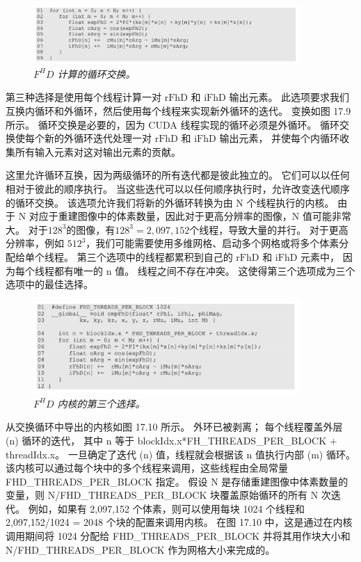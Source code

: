 \begin{figure}[H]
	\centering
	\includegraphics[width=0.9\textwidth]{figs/F17.9.png}
	\caption{\textit{$F^H D$ 计算的循环交换。}}
\end{figure}

第三种选择是使用每个线程计算一对 $\mathrm{rFhD}$ 和 $\mathrm{iFhD}$ 输出元素。 
此选项要求我们互换内循环和外循环，然后使用每个线程来实现新外循环的迭代。 
变换如图 17.9 所示。 循环交换是必要的，因为 CUDA 线程实现的循环必须是外循环。 
循环交换使每个新的外循环迭代处理一对 $\mathrm{rFhD}$ 和 $\mathrm{iFhD}$ 输出元素，
并使每个内循环收集所有输入元素对这对输出元素的贡献。

这里允许循环互换，因为两级循环的所有迭代都是彼此独立的。 它们可以以任何相对于彼此的顺序执行。 
当这些迭代可以以任何顺序执行时，允许改变迭代顺序的循环交换。 该选项允许我们将新的外循环转换为由 N 个线程执行的内核。 
由于 N 对应于重建图像中的体素数量，因此对于更高分辨率的图像，$\mathrm{N}$ 值可能非常大。 
对于$128^{3}$的图像，有$128^{3}=$$2,097,152$个线程，导致大量的并行。 
对于更高分辨率，例如 $512^{3}$，我们可能需要使用多维网格、启动多个网格或将多个体素分配给单个线程。 
第三个选项中的线程都累积到自己的 $\mathrm{rFhD}$ 和 $\mathrm{iFhD}$ 元素中，
因为每个线程都有唯一的 $\mathrm{n}$ 值。 线程之间不存在冲突。 这使得第三个选项成为三个选项中的最佳选择。

\begin{figure}[H]
	\centering
	\includegraphics[width=0.9\textwidth]{figs/F17.10.png}
	\caption{\textit{$F^H D$ 内核的第三个选择。}}
\end{figure}

从交换循环中导出的内核如图 17.10 所示。 
外环已被剥离； 每个线程覆盖外层 (n) 循环的迭代，
其中 $\mathrm{n}$ 等于 blockIdx.x*FH\_THREADS\_PER\_BLOCK + threadIdx.x。 
一旦确定了迭代 (n) 值，线程就会根据该 $\mathrm{n}$ 值执行内部 (m) 循环。 
该内核可以通过每个块中的多个线程来调用，这些线程由全局常量 FHD\_THREADS\_PER\_BLOCK 指定。 
假设 $\mathrm{N}$ 是存储重建图像中体素数量的变量，则 N/FHD\_THREADS\_PER\_BLOCK 块覆盖原始循环的所有 N 次迭代。 
例如，如果有 2,097,152 个体素，则可以使用每块 1024 个线程和 2,097,152/1024 = 2048 个块的配置来调用内核。 
在图 17.10 中，这是通过在内核调用期间将 1024 分配给 FHD\_THREADS\_PER\_BLOCK 
并将其用作块大小和 N/FHD\_THREADS\_PER\_BLOCK 作为网格大小来完成的。

